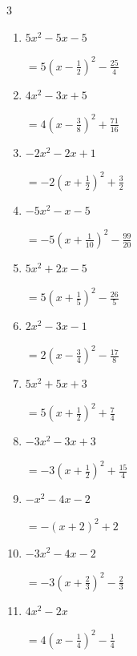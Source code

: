 \newpage
\resetdrill

\begin{multicols}{3}
\begin{enumerate}
  \itemsep=90pt
  \item $5x^{2}-5x-5$

        $\displaystyle =5\left( x-\frac{1}{2}\right)^{2}-\frac{25}{4}$

  \item $4x^{2}-3x+5$

        $\displaystyle =4\left( x-\frac{3}{8}\right)^{2}+\frac{71}{16}$

  \item $-2x^{2}-2x+1$

        $\displaystyle =-2\left( x+\frac{1}{2}\right)^{2}+\frac{3}{2}$

  \item $-5x^{2}-x-5$

        $\displaystyle =-5\left( x+\frac{1}{10}\right)^{2}-\frac{99}{20}$

  \item $5x^{2}+2x-5$

        $\displaystyle =5\left( x+\frac{1}{5}\right)^{2}-\frac{26}{5}$

\columnbreak %

  \item $2x^{2}-3x-1$

        $\displaystyle =2\left( x-\frac{3}{4}\right)^{2}-\frac{17}{8}$

  \item $5x^{2}+5x+3$

        $\displaystyle =5\left( x+\frac{1}{2}\right)^{2}+\frac{7}{4}$

  \item $-3x^{2}-3x+3$

        $\displaystyle =-3\left( x+\frac{1}{2}\right)^{2}+\frac{15}{4}$

  \item $-x^{2}-4x-2$

        $\displaystyle =-\left( x+2\right)^{2}+2$

  \item $-3x^{2}-4x-2$

        $\displaystyle =-3\left( x+\frac{2}{3}\right)^{2}-\frac{2}{3}$

\columnbreak %

  \item $4x^{2}-2x$

        $\displaystyle =4\left( x-\frac{1}{4}\right)^{2}-\frac{1}{4}$


\end{enumerate}
\end{multicols}
